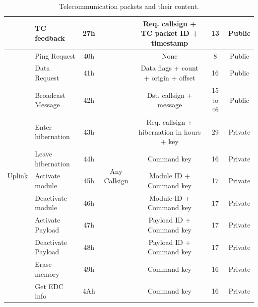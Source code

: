 \begin{landscape}
\begin{table}[ht]
\begin{tabular}{llccccc}
                                      & TC feedback           & 27h &                                     & Req. callsign + TC packet ID + timestamp   & 13                    & Public \\
            \midrule
            \multirow{11}{*}{Uplink}  & Ping Request          & 40h & \multirow{11}{*}{Any Callsign}      & None                                       & 8                     & Public \\
                                      & Data Request          & 41h &                                     & Data flags + count + origin + offset       & 16                    & Public \\
                                      & Broadcast Message     & 42h &                                     & Dst. callsign + message                    & 15 to 46              & Public \\
                                      & Enter hibernation     & 43h &                                     & Req. callsign + hibernation in hours + key & 29                    & Private \\
                                      & Leave hibernation     & 44h &                                     & Command key                                & 16                    & Private \\
                                      & Activate module       & 45h &                                     & Module ID + Command key                    & 17                    & Private \\
                                      & Deactivate module     & 46h &                                     & Module ID + Command key                    & 17                    & Private \\
                                      & Activate Payload      & 47h &                                     & Payload ID + Command key                   & 17                    & Private \\
                                      & Deactivate Payload    & 48h &                                     & Payload ID + Command key                   & 17                    & Private \\
                                      & Erase memory          & 49h &                                     & Command key                                & 16                    & Private \\
                                      & Get EDC info          & 4Ah &                                     & Command key                                & 16                    & Private \\
            \bottomrule[1.5pt]
        \end{tabular}
        \caption{Telecommunication packets and their content.}
        \label{tab:packets-struct}
    \end{table}
\end{landscape}

